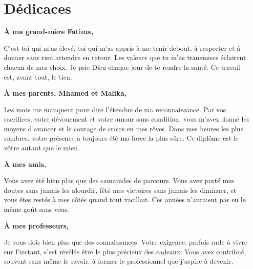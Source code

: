 
\chapter*{Dédicaces}
\thispagestyle{plain}

\begin{center}
\itshape

\vspace{0.5cm}

\textbf{À ma grand-mère Fatima,}

\smallskip
C'est toi qui m'as élevé, toi qui m'as appris à me tenir debout, à respecter et à
donner sans rien attendre en retour. Les valeurs que tu m'as transmises éclairent
chacun de mes choix. Je prie Dieu chaque jour de te rendre la santé. Ce travail est,
avant tout, le tien.

\medskip

\textbf{À mes parents, Mhamed et Malika,}

\smallskip
Les mots me manquent pour dire l'étendue de ma reconnaissance. Par vos sacrifices,
votre dévouement et votre amour sans condition, vous m'avez donné les moyens d'avancer
et le courage de croire en mes rêves. Dans mes heures les plus sombres, votre présence
a toujours été ma force la plus sûre. Ce diplôme est le vôtre autant que le mien.

\medskip

\textbf{À mes amis,}

\smallskip
Vous avez été bien plus que des camarades de parcours. Vous avez porté mes doutes sans
jamais les alourdir, fêté mes victoires sans jamais les diminuer, et vous êtes restés
à mes côtés quand tout vacillait. Ces années n'auraient pas eu le même goût sans vous.

\medskip

\textbf{À mes professeurs,}

\smallskip
Je vous dois bien plus que des connaissances. Votre exigence, parfois rude à vivre sur
l'instant, s'est révélée être le plus précieux des cadeaux. Vous avez contribué, souvent
sans même le savoir, à former le professionnel que j'aspire à devenir.

\end{center}

\newpage
